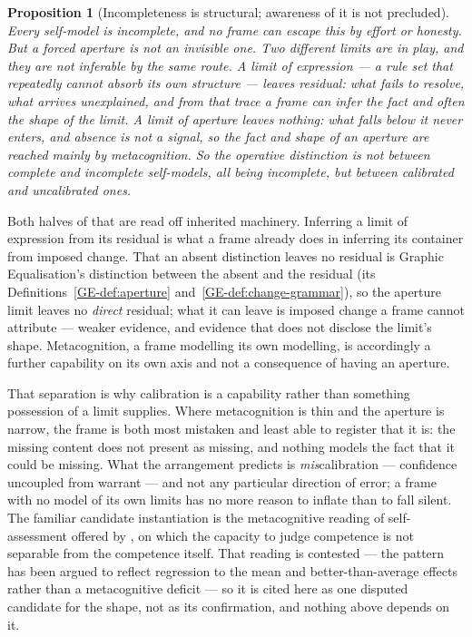 \documentclass[11pt,a4paper]{article}
\newtheorem{proposition}[definition]{Proposition}
\theoremstyle{remark}\newtheorem{remark}[definition]{Remark}
\begin{document}
\begin{proposition}[Incompleteness is structural; awareness of it is not precluded]\label{prop:selfmodel}
Every self-model is incomplete, and no frame can escape this by effort or honesty. But a
forced aperture is not an invisible one. Two different limits are in play, and they are not
inferable by the same route. A limit of \emph{expression} --- a rule set that repeatedly
cannot absorb its own structure --- leaves residual: what fails to resolve, what arrives
unexplained, and from that trace a frame can infer the fact and often the shape of the
limit. A limit of \emph{aperture} leaves nothing: what falls below it never enters, and
absence is not a signal, so the fact and shape of an aperture are reached mainly by
\emph{metacognition}. So the operative distinction is not between complete and incomplete
self-models, all being incomplete, but between \emph{calibrated} and \emph{uncalibrated}
ones.
\end{proposition}

Both halves of that are read off inherited machinery. Inferring a limit of expression from
its residual is what a frame already does in inferring its container from imposed change.
That an absent distinction leaves no residual is Graphic Equalisation's distinction between
the absent and the residual (its Definitions~\ref{GE-def:aperture}
and~\ref{GE-def:change-grammar}), so the aperture limit leaves no \emph{direct} residual;
what it can leave is imposed change a frame cannot attribute --- weaker evidence, and
evidence that does not disclose the limit's shape. Metacognition, a frame modelling its own
modelling, is accordingly a further capability on its own axis and not a consequence of
having an aperture.

That separation is why calibration is a capability rather than something possession of a limit
supplies. Where metacognition is thin and the aperture is narrow, the frame is both most
mistaken and least able to register that it is: the missing content does not present as missing,
and nothing models the fact that it could be missing. What the arrangement predicts is \emph{mis}calibration --- confidence uncoupled from
warrant --- and not any particular direction of error; a frame with no model of its own limits has
no more reason to inflate than to fall silent. The familiar candidate instantiation is the
metacognitive reading of self-assessment offered by \citet{kruger1999}, on which the capacity to
judge competence is not separable from the competence itself. That reading is contested --- the
pattern has been argued to reflect regression to the mean and better-than-average effects rather
than a metacognitive deficit --- so it is cited here as one disputed candidate for the shape, not
as its confirmation, and nothing above depends on it.
\end{document}
